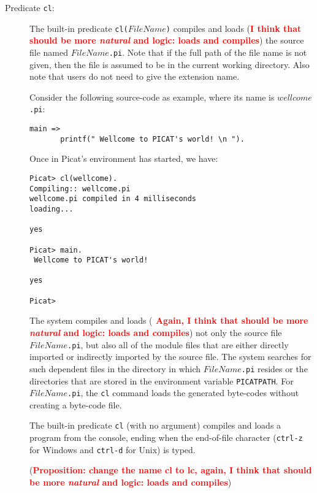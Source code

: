 \begin{description}

\item[Predicate \texttt{cl}:]
The built-in predicate \texttt{cl($FileName$)} compiles and loads ({\bf \textcolor{red}{I think that should be more {\em natural} and logic: loads and compiles}}) the source file named \texttt{$FileName$.pi}. Note that if the full path of the file name is not given, then the file is assumed to be in the current working directory. Also note that users do not need to give the extension name.

Consider the following source-code as example,
where its name is \texttt {$wellcome$.pi}:

\begin{verbatim}
main =>
       printf(" Wellcome to PICAT's world! \n ").
\end{verbatim}

Once in Picat's environment has started, we have:

\begin{verbatim}
Picat> cl(wellcome).   
Compiling:: wellcome.pi
wellcome.pi compiled in 4 milliseconds
loading...

yes

Picat> main.
 Wellcome to PICAT's world! 
 
yes

Picat> 
\end{verbatim}


 The system compiles and loads ({\bf \textcolor{red}{ Again, I think that should be more {\em natural} and logic: loads and compiles}}) not only the source file \texttt{$FileName$.pi}, but also all of the module files that are either directly imported or indirectly imported by the source file. The system searches for such dependent files in the directory in which \texttt{$FileName$.pi} resides or the directories that are stored in the environment variable \texttt{PICATPATH}. For \texttt{$FileName$.pi}, the \texttt{cl} command loads the generated byte-codes without creating a byte-code file.



The built-in predicate \texttt{cl} (with no argument) compiles and loads a program from the console, ending when the end-of-file character ({\tt ctrl-z} for Windows and {\tt ctrl-d} for Unix) is typed.



({\bf \textcolor{red}{Proposition: change the name cl to lc, again, I think that should be more {\em natural} and logic: loads and compiles}})




\end{description}

